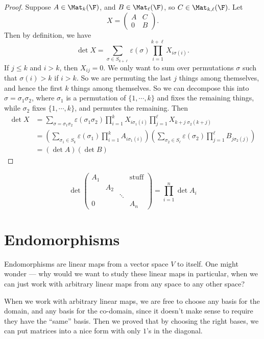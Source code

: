 \documentclass[a4paper]{article}
\begin{document}
\begin{proof}
  Suppose $A\in \Mat_k(\F)$, and $B\in \Mat_{\ell}(\F)$, so $C \in \Mat_{k, \ell}(\F)$. Let
  \[
    X =
    \begin{pmatrix}
      A & C\\
      0 & B
    \end{pmatrix}.
  \]
  Then by definition, we have
  \[
    \det X = \sum_{\sigma \in S_{k + \ell}}\varepsilon(\sigma) \prod_{i = 1}^{k + \ell} X_{i\sigma(i)}.
  \]
  If $j \leq k$ and $i > k$, then $X_{ij} = 0$. We only want to sum over permutations $\sigma$ such that $\sigma(i) > k$ if $i > k$. So we are permuting the last $j$ things among themselves, and hence the first $k$ things among themselves. So we can decompose this into $\sigma = \sigma_1 \sigma_2$, where $\sigma_1$ is a permutation of $\{1, \cdots, k\}$ and fixes the remaining things, while $\sigma_2$ fixes $\{1, \cdots, k\}$, and permutes the remaining. Then
  \begin{align*}
    \det X &= \sum_{\sigma = \sigma_1\sigma_2}\varepsilon(\sigma_1\sigma_2) \prod_{i = 1}^k X_{i\sigma_1(i)} \prod_{j = 1}^\ell X_{k + j\; \sigma_2(k + j)}\\
    &= \left(\sum_{\sigma_1 \in S_k} \varepsilon(\sigma_1) \prod_{i = 1}^k A_{i\sigma_1(i)}\right)\left(\sum_{\sigma_2 \in S_\ell} \varepsilon(\sigma_2) \prod_{j = 1}^\ell B_{j\sigma_2(j)}\right)\\
    &= (\det A)(\det B)
  \end{align*}
\end{proof}

\begin{cor}
  \[
    \det
    \begin{pmatrix}
      A_1 & & & \mathrm{stuff}\\
      & A_2\\
      & & \ddots\\
      0 & & & A_n
    \end{pmatrix} = \prod_{i = 1}^n \det A_i
  \]
\end{cor}

\section{Endomorphisms}
Endomorphisms are linear maps from a vector space $V$ to itself. One might wonder --- why would we want to study these linear maps in particular, when we can just work with arbitrary linear maps from any space to any other space?

When we work with arbitrary linear maps, we are free to choose any basis for the domain, and any basis for the co-domain, since it doesn't make sense to require they have the ``same'' basis. Then we proved that by choosing the right bases, we can put matrices into a nice form with only $1$'s in the diagonal.
\end{document}
